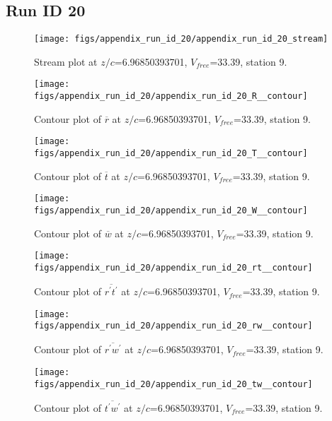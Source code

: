 \subsection{Run ID 20}
\begin{figure}[H]
\centering
\texttt{[image: figs/appendix\_run\_id\_20/appendix\_run\_id\_20\_stream]}
\caption{Stream plot at $z/c$=6.96850393701, $V_{free}$=33.39, station 9.}
\label{fig:appendix_run_id_20_stream}
\end{figure}


\begin{figure}[H]
\centering
\texttt{[image: figs/appendix\_run\_id\_20/appendix\_run\_id\_20\_R\_\_contour]}
\caption{Contour plot of $\overline{r}$ at $z/c$=6.96850393701, $V_{free}$=33.39, station 9.}
\label{fig:appendix_run_id_20_R__contour}
\end{figure}


\begin{figure}[H]
\centering
\texttt{[image: figs/appendix\_run\_id\_20/appendix\_run\_id\_20\_T\_\_contour]}
\caption{Contour plot of $\overline{t}$ at $z/c$=6.96850393701, $V_{free}$=33.39, station 9.}
\label{fig:appendix_run_id_20_T__contour}
\end{figure}


\begin{figure}[H]
\centering
\texttt{[image: figs/appendix\_run\_id\_20/appendix\_run\_id\_20\_W\_\_contour]}
\caption{Contour plot of $\overline{w}$ at $z/c$=6.96850393701, $V_{free}$=33.39, station 9.}
\label{fig:appendix_run_id_20_W__contour}
\end{figure}


\begin{figure}[H]
\centering
\texttt{[image: figs/appendix\_run\_id\_20/appendix\_run\_id\_20\_rt\_\_contour]}
\caption{Contour plot of $\overline{r^\prime t^\prime}$ at $z/c$=6.96850393701, $V_{free}$=33.39, station 9.}
\label{fig:appendix_run_id_20_rt__contour}
\end{figure}


\begin{figure}[H]
\centering
\texttt{[image: figs/appendix\_run\_id\_20/appendix\_run\_id\_20\_rw\_\_contour]}
\caption{Contour plot of $\overline{r^\prime w^\prime}$ at $z/c$=6.96850393701, $V_{free}$=33.39, station 9.}
\label{fig:appendix_run_id_20_rw__contour}
\end{figure}


\begin{figure}[H]
\centering
\texttt{[image: figs/appendix\_run\_id\_20/appendix\_run\_id\_20\_tw\_\_contour]}
\caption{Contour plot of $\overline{t^\prime w^\prime}$ at $z/c$=6.96850393701, $V_{free}$=33.39, station 9.}
\label{fig:appendix_run_id_20_tw__contour}
\end{figure}


